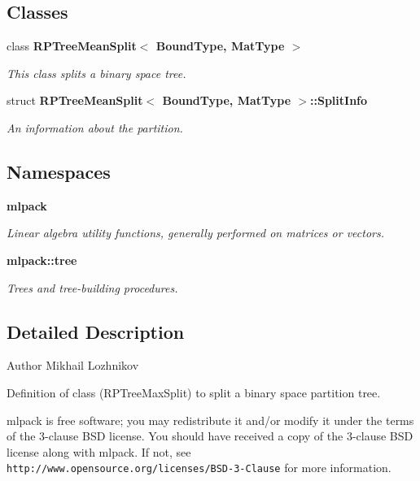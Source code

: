 \subsection*{Classes}
\begin{DoxyCompactItemize}
\item 
class \textbf{ R\+P\+Tree\+Mean\+Split$<$ Bound\+Type, Mat\+Type $>$}
\begin{DoxyCompactList}\small\item\em This class splits a binary space tree. \end{DoxyCompactList}\item 
struct \textbf{ R\+P\+Tree\+Mean\+Split$<$ Bound\+Type, Mat\+Type $>$\+::\+Split\+Info}
\begin{DoxyCompactList}\small\item\em An information about the partition. \end{DoxyCompactList}\end{DoxyCompactItemize}
\subsection*{Namespaces}
\begin{DoxyCompactItemize}
\item 
 \textbf{ mlpack}
\begin{DoxyCompactList}\small\item\em Linear algebra utility functions, generally performed on matrices or vectors. \end{DoxyCompactList}\item 
 \textbf{ mlpack\+::tree}
\begin{DoxyCompactList}\small\item\em Trees and tree-\/building procedures. \end{DoxyCompactList}\end{DoxyCompactItemize}


\subsection{Detailed Description}
\begin{DoxyAuthor}{Author}
Mikhail Lozhnikov
\end{DoxyAuthor}
Definition of class (R\+P\+Tree\+Max\+Split) to split a binary space partition tree.

mlpack is free software; you may redistribute it and/or modify it under the terms of the 3-\/clause B\+SD license. You should have received a copy of the 3-\/clause B\+SD license along with mlpack. If not, see {\tt http\+://www.\+opensource.\+org/licenses/\+B\+S\+D-\/3-\/\+Clause} for more information. 